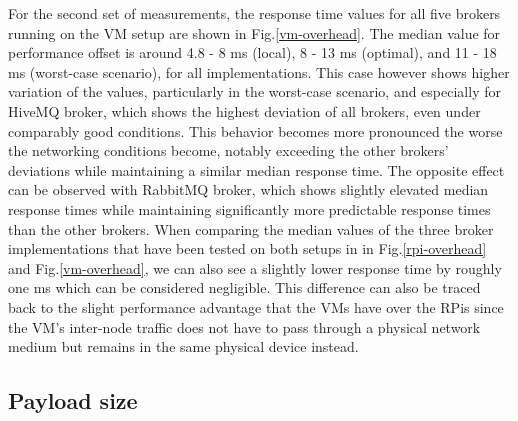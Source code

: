 \documentclass[conference]{IEEEtran}
\begin{document}
For the second set of measurements, the response time values for all five brokers running on the VM
setup are shown in Fig.\ref{vm-overhead}. The median value for performance offset is around
4.8 - 8 ms (local), 8 - 13 ms (optimal), and 11 - 18 ms (worst-case scenario), for all implementations. This case however shows higher variation of the values, particularly in the worst-case scenario, and
especially for HiveMQ broker, which shows the highest deviation of all brokers, even under
comparably good conditions. This behavior becomes more pronounced the worse the networking
conditions become, notably exceeding the other brokers' deviations while maintaining a similar
median response time. The opposite effect can be observed with RabbitMQ broker, which shows
slightly elevated median response times while maintaining significantly more predictable response
times than the other brokers. When comparing the median values of the three broker implementations
that have been tested on both setups in in Fig.\ref{rpi-overhead} and Fig.\ref{vm-overhead}, we can
also see a slightly lower response time by roughly one ms which can be considered negligible. This
difference can also be traced back to the slight performance advantage that the VMs have over the
RPis since the VM's inter-node traffic does not have to pass through a physical network medium but
remains in the same physical device instead.

\subsection{Payload size}
\end{document}
